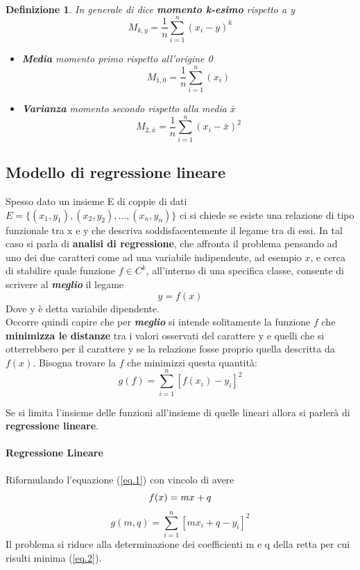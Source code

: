 \documentclass{article}
\newtheorem{definition}{Definizione}[section]
\begin{document}
       \paragraph{}
        \begin{definition}
          In generale di dice \textbf{momento k-esimo} rispetto a y
            $$M_{k,y} = \frac{1}{n} \sum_{i=1}^n(x_i-y)^k$$
            \begin{itemize}
                \item \textbf{Media} momento primo rispetto all'origine 0$$M_{1,0} = \frac{1}{n} \sum_{i=1}^n(x_i)$$
                \item \textbf{Varianza} momento secondo rispetto alla media $\bar{x}$
                  $$M_{2,\bar{x}} = \frac{1}{n} \sum_{i=1}^n(x_i-\bar{x})^2$$
            \end{itemize}{}
            \end{definition}
        \newpage
        \subsection{Modello di regressione lineare}
        Spesso dato un insieme E di coppie di dati
        $E = \{(x_1,y_1),(x_2,y_2),...,(x_n,y_n)\}$ ci si chiede se esiste una relazione di tipo funzionale tra x e y che descriva soddisfacentemente il legame tra di essi. 
        In tal caso si parla di \textbf{analisi di regressione}, che affronta il problema pensando ad uno dei due caratteri come ad una variabile indipendente, ad esempio $x$, e cerca di stabilire quale funzione $f \in C^k$, all'interno di una specifica classe, consente di scrivere al \textbf{\textit{meglio}} il legame $$y=f(x)$$ Dove y è detta variabile dipendente. \\
        Occorre quindi capire che per \textbf{\textit{meglio}} si intende solitamente la funzione $f$ che \textbf{minimizza le distanze} tra i valori osservati del carattere y e quelli che si otterrebbero per il carattere y se la relazione fosse proprio quella descritta da $f(x)$.
         \bigbreak %
        Bisogna trovare la $f$ che minimizzi questa quantità:
        \begin{equation}\label{eq.1}
            g(f) = \sum_{i=1}^n\left[ f(x_i)-y_i\right]^2
        \end{equation}{}
      
        Se si limita l'insieme delle funzioni all'insieme di quelle lineari allora si parlerà di \textbf{regressione lineare}. 
        \paragraph{Regressione Lineare} Riformulando l'equazione (\ref{eq.1}) con vincolo di avere $$f(x) = mx + q\\$$ 
         \begin{equation}\label{eq.2}
            g(m,q) = \sum_{i=1}^n\left[ mx_i+q -y_i\right]^2
        \end{equation}{}
        Il problema si riduce alla determinazione dei coefficienti m e q della retta per cui risulti minima (\ref{eq.2}).
       
\end{document}
